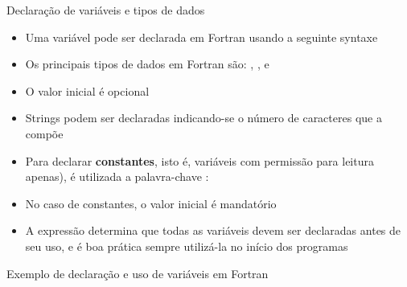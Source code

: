 \begin{frame}[fragile]{Declaração de variáveis e tipos de dados}

    \begin{itemize}
        \item Uma variável pode ser declarada em Fortran usando a seguinte syntaxe


        \item Os principais tipos de dados em Fortran são: , 
            ,  e 
        
        \item O valor inicial é opcional

        \item Strings podem ser declaradas indicando-se o número de caracteres que a compõe


        \item Para declarar \textbf{constantes}, isto é, variáveis com permissão para leitura
            apenas), é utilizada a palavra-chave :

    
        \item No caso de constantes, o valor inicial é mandatório

        \item A expressão  determina que todas as variáveis devem
            ser declaradas antes de seu uso, e é boa prática sempre utilizá-la no início dos
            programas
    \end{itemize}

\end{frame}

\begin{frame}[fragile]{Exemplo de declaração e uso de variáveis em Fortran}
\end{frame}

